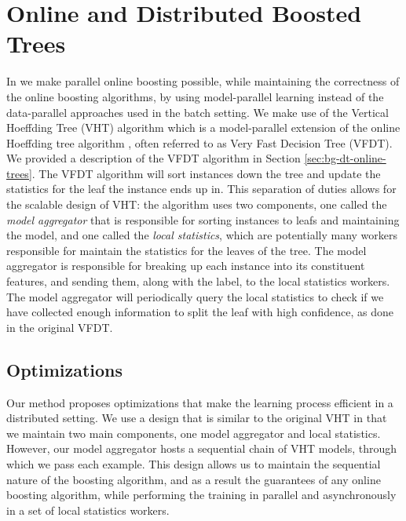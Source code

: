 \section{Online and Distributed Boosted Trees}
\label{sec:boostvht-method}

In \boostvht we make parallel online boosting possible, while maintaining the
correctness of the online boosting algorithms, by using model-parallel learning
instead of the data-parallel approaches used in the batch setting.
We make use of the Vertical Hoeffding Tree (VHT) algorithm \cite{kourtellis2016vht} which is a model-parallel
extension of the online Hoeffding tree algorithm \cite{vfdt}, often referred to as
Very Fast Decision Tree (VFDT).
We provided a description of the VFDT algorithm in Section \ref{sec:bg-dt-online-trees}.
The VFDT algorithm will sort instances down the tree and update the statistics for the
leaf the instance ends up in. This separation of duties allows for the scalable design of
VHT: the algorithm uses two components, one called the \emph{model aggregator}
that is responsible for sorting instances to leafs and maintaining the model, and
one called the \emph{local statistics}, which are potentially many workers responsible
for maintain the statistics for the leaves of the tree.
The model aggregator is responsible for breaking up each instance into its constituent
features, and sending them, along with the label, to the local statistics workers.
The model aggregator will periodically query the local statistics to check if we have
collected enough information to split the leaf with high confidence, as done in the
original VFDT.

\subsection*{Optimizations}

Our method proposes optimizations that make the learning process efficient in a distributed
setting. We use a design that is similar to the original VHT in that we maintain
two main components, one model aggregator and local statistics. However, our model
aggregator hosts a sequential chain of VHT models, through which we pass each example.
This design allows us to maintain the sequential nature of the boosting algorithm,
and as a result the guarantees of any online boosting algorithm, while performing
the training in parallel and asynchronously in a set of local statistics workers.

